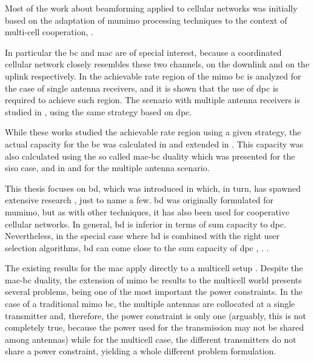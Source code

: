 Most of the work about beamforming applied to cellular networks was initially
based on the adaptation of \gls{mumimo} processing techniques to the context of
multi-cell cooperation, \cite{gesbert10}.

In particular the \gls{bc} and \gls{mac} are of special interest, because a
coordinated cellular network closely resembles these two channels, on the
downlink and on the uplink respectively. In \cite{caire00} the achievable rate
region of the \gls{mimo} \gls{bc} is analyzed for the case of single antenna
receivers, and it is shown that the use of \gls{dpc} is required to achieve such
region. The scenario with multiple antenna receivers is studied in \cite{yu01},
using the same strategy based on \gls{dpc}.

While these works studied the achievable rate region using a given strategy,
the actual capacity for the \gls{bc} was calculated in \cite{yu04} and extended 
in \cite{weingarten06}. This capacity was also calculated using the so called
\gls{mac}-\gls{bc} duality which was presented \cite{jindal01} for the
\gls{siso} case, and in \cite{vishwanath02} and \cite{jindal04} for the multiple
antenna scenario.

This thesis focuses on \gls{bd}, which was introduced in \cite{spencer04}
which, in turn, has spawned extensive research \cite{spencer04b, yoo06,
gesbert07b, shen06, wiesel08, stankovic08}, just to name a few. \gls{bd} was
originally formulated for \gls{mumimo}, but as with other techniques, it has
also been used for cooperative cellular networks. In general, \gls{bd} is
inferior in terms of sum capacity to \gls{dpc}. Nevertheless, in the special
case where \gls{bd} is combined with the right user selection algorithms,
\gls{bd} can come close to the sum capacity of \gls{dpc} \cite{yoo06},
\cite{shen06}.
.

The existing results for the \gls{mac} apply directly to a multicell setup
\cite{jafar04}. Despite the \gls{mac}-\gls{bc} duality, the extension of
\gls{mimo} \gls{bc} results to the multicell world presents several problems,
being one of the most important the power constraints. In the case of a
traditional \gls{mimo} \gls{bc}, the multiple antennas are collocated at a
single transmitter and, therefore, the power constraint is only one (arguably,
this is not completely true, because the power used for the transmission may not
be shared among antennas) while for the multicell case, the different
transmitters do not share a power constraint, yielding a whole different problem
formulation.

